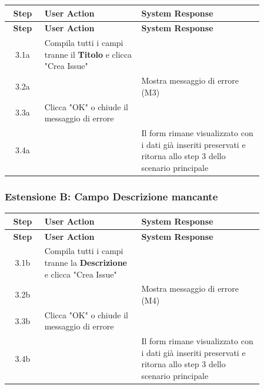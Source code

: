 \begin{longtable}{|c|p{0.38\linewidth}|p{0.48\linewidth}|}
\hline
\textbf{Step} & \textbf{User Action} & \textbf{System Response} \\ \hline
\endfirsthead

\hline
\textbf{Step} & \textbf{User Action} & \textbf{System Response} \\ \hline
\endhead

\hline
\endfoot

3.1a & Compila tutti i campi tranne il \textbf{Titolo} e clicca "Crea Issue" & \\ \hline

3.2a & & Mostra messaggio di errore (M3) \\ \hline

3.3a & Clicca "OK" o chiude il messaggio di errore & \\ \hline

3.4a & & Il form rimane visualizzato con i dati già inseriti preservati e ritorna allo step 3 dello scenario principale \\ \hline

\end{longtable}

\subsubsection*{Estensione B: Campo Descrizione mancante}

\begin{longtable}{|c|p{0.38\linewidth}|p{0.48\linewidth}|}
\hline
\textbf{Step} & \textbf{User Action} & \textbf{System Response} \\ \hline
\endfirsthead

\hline
\textbf{Step} & \textbf{User Action} & \textbf{System Response} \\ \hline
\endhead

\hline
\endfoot

3.1b & Compila tutti i campi tranne la \textbf{Descrizione} e clicca "Crea Issue" & \\ \hline

3.2b & & Mostra messaggio di errore (M4) \\ \hline

3.3b & Clicca "OK" o chiude il messaggio di errore & \\ \hline

3.4b & & Il form rimane visualizzato con i dati già inseriti preservati e ritorna allo step 3 dello scenario principale \\ \hline

\end{longtable}

